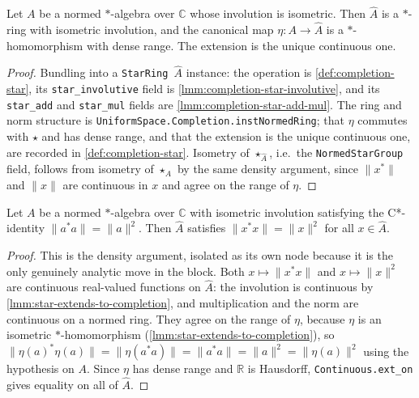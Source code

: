 \begin{lemma}
    \label{lmm:star-extends-to-completion}
    Let $A$ be a normed $*$-algebra over $\mathbb{C}$ whose involution is isometric. Then $\widehat{A}$ is a $*$-ring with isometric involution, and the canonical map $\eta : A \to \widehat{A}$ is a $*$-homomorphism with dense range. The extension is the unique continuous one.
\end{lemma}
\begin{proof}
    Bundling into a \texttt{StarRing \ensuremath{\widehat{A}}} instance: the operation is \ref{def:completion-star}, its \texttt{star\_involutive} field is \ref{lmm:completion-star-involutive}, and its \texttt{star\_add} and \texttt{star\_mul} fields are \ref{lmm:completion-star-add-mul}. The ring and norm structure is \texttt{UniformSpace.Completion.instNormedRing}; that $\eta$ commutes with $\star$ and has dense range, and that the extension is the unique continuous one, are recorded in \ref{def:completion-star}. Isometry of $\star_{\widehat{A}}$, i.e.\ the \texttt{NormedStarGroup} field, follows from isometry of $\star_A$ by the same density argument, since $\|x^{*}\|$ and $\|x\|$ are continuous in $x$ and agree on the range of $\eta$.
\end{proof}

\begin{lemma}
    \label{lmm:completion-cstar-identity}
    Let $A$ be a normed $*$-algebra over $\mathbb{C}$ with isometric involution satisfying the C*-identity $\|a^{*}a\| = \|a\|^{2}$. Then $\widehat{A}$ satisfies $\|x^{*}x\| = \|x\|^{2}$ for all $x \in \widehat{A}$.
\end{lemma}
\begin{proof}
    This is the density argument, isolated as its own node because it is the only genuinely analytic move in the block. Both $x \mapsto \|x^{*}x\|$ and $x \mapsto \|x\|^{2}$ are continuous real-valued functions on $\widehat{A}$: the involution is continuous by \ref{lmm:star-extends-to-completion}, and multiplication and the norm are continuous on a normed ring. They agree on the range of $\eta$, because $\eta$ is an isometric $*$-homomorphism (\ref{lmm:star-extends-to-completion}), so $\|\eta(a)^{*}\eta(a)\| = \|\eta(a^{*}a)\| = \|a^{*}a\| = \|a\|^{2} = \|\eta(a)\|^{2}$ using the hypothesis on $A$. Since $\eta$ has dense range and $\mathbb{R}$ is Hausdorff, \texttt{Continuous.ext\_on} gives equality on all of $\widehat{A}$.
\end{proof}

